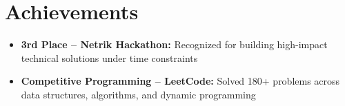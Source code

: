 \documentclass[letterpaper,9pt]{article}
\begin{document}
\section{Achievements}

\begin{itemize}[leftmargin=0.15in, itemsep=0pt, parsep=1pt]
\item \textbf{3rd Place -- Netrik Hackathon:} Recognized for building high-impact technical solutions under time constraints
\item \textbf{Competitive Programming -- LeetCode:} Solved 180+ problems across data structures, algorithms, and dynamic programming
\end{itemize}
\end{document}
